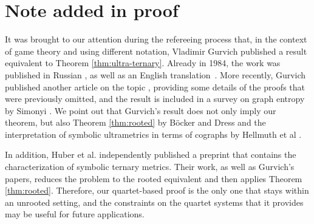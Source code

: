 \documentclass{article}
\begin{document}







\section{Note added in proof}

It was brought to our attention during the refereeing process that, in the context of game theory
and using different notation, Vladimir Gurvich published a result equivalent to Theorem \ref{thm:ultra-ternary}.
Already in 1984, the work was published in Russian \cite{Gurvich1984}, as well as an English
translation~\cite{Gurvich1984b}. More recently, Gurvich published another article on the topic \cite{Gurvich2009},
providing some details of the proofs that were previously omitted, and the result is included in a survey on graph
entropy by Simonyi \cite{Simonyi2001}. We point out that Gurvich’s result does not only imply our theorem, but also
Theorem \ref{thm:rooted} by B\"ocker and Dress \cite{Bocker1998} and the interpretation of symbolic ultrametrics in terms of cographs by
Hellmuth et al \cite{Hellmuth2013}. 


In addition, Huber et al. \cite{Huber2017} independently published a preprint that contains the characterization of symbolic ternary
metrics. Their work, as well as Gurvich’s papers, reduces the problem to the rooted equivalent and then applies Theorem \ref{thm:rooted}.
Therefore, our quartet-based proof is the only one that stays within an unrooted setting, and the constraints on the quartet systems that
it provides may be useful for future applications.
\end{document}
